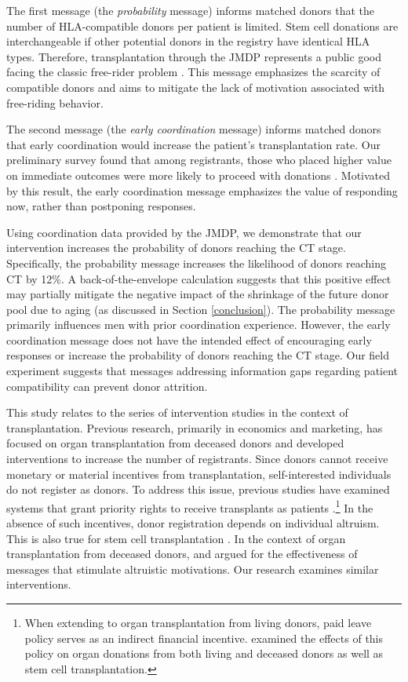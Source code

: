 \documentclass[12pt, a4paper]{article}
\begin{document}
The first message (the \emph{probability} message) informs matched donors that the number of HLA-compatible donors per patient is limited. Stem cell donations are interchangeable if other potential donors in the registry have identical HLA types. Therefore, transplantation through the JMDP represents a public good facing the classic free-rider problem \citep{Bergstrom2009}. This message emphasizes the scarcity of compatible donors and aims to mitigate the lack of motivation associated with free-riding behavior.

The second message (the \emph{early coordination} message) informs matched donors that early coordination would increase the patient's transplantation rate. Our preliminary survey found that among registrants, those who placed higher value on immediate outcomes were more likely to proceed with donations \citep{Ohtake2020}. Motivated by this result, the early coordination message emphasizes the value of responding now, rather than postponing responses.

Using coordination data provided by the JMDP, we demonstrate that our intervention increases the probability of donors reaching the CT stage. Specifically, the probability message increases the likelihood of donors reaching CT by 12\%. A back-of-the-envelope calculation suggests that this positive effect may partially mitigate the negative impact of the shrinkage of the future donor pool due to aging (as discussed in Section \ref{conclusion}). The probability message primarily influences men with prior coordination experience. However, the early coordination message does not have the intended effect of encouraging early responses or increase the probability of donors reaching the CT stage. Our field experiment suggests that messages addressing information gaps regarding patient compatibility can prevent donor attrition.

This study relates to the series of intervention studies in the context of transplantation. Previous research, primarily in economics and marketing, has focused on organ transplantation from deceased donors and developed interventions to increase the number of registrants. Since donors cannot receive monetary or material incentives from transplantation, self-interested individuals do not register as donors. To address this issue, previous studies have examined systems that grant priority rights to receive transplants as patients \citep{Kessler2012, Li2013, Stoler2017}.\footnote{When extending to organ transplantation from living donors, paid leave policy serves as an indirect financial incentive. \citet{Lacetera2014} examined the effects of this policy on organ donations from both living and deceased donors as well as stem cell transplantation.} In the absence of such incentives, donor registration depends on individual altruism. This is also true for stem cell transplantation \citep{Bergstrom2009, Ohtake2020}. In the context of organ transplantation from deceased donors, \citet{Sallis2018} and \citet{Robitaille2021} argued for the effectiveness of messages that stimulate altruistic motivations. Our research examines similar interventions.
\end{document}
